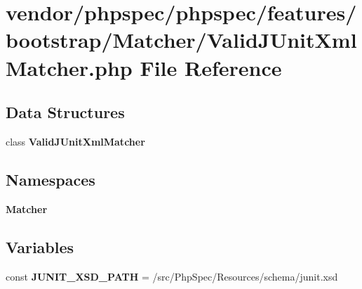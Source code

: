 \section{vendor/phpspec/phpspec/features/bootstrap/\+Matcher/\+Valid\+J\+Unit\+Xml\+Matcher.php File Reference}
\label{_valid_j_unit_xml_matcher_8php}
\subsection*{Data Structures}
\begin{DoxyCompactItemize}
\item 
class {\bf Valid\+J\+Unit\+Xml\+Matcher}
\end{DoxyCompactItemize}
\subsection*{Namespaces}
\begin{DoxyCompactItemize}
\item 
 {\bf Matcher}
\end{DoxyCompactItemize}
\subsection*{Variables}
\begin{DoxyCompactItemize}
\item 
const {\bf J\+U\+N\+I\+T\+\_\+\+X\+S\+D\+\_\+\+P\+A\+T\+H} = \textquotesingle{}/src/Php\+Spec/Resources/schema/junit.\+xsd\textquotesingle{}
\end{DoxyCompactItemize}
